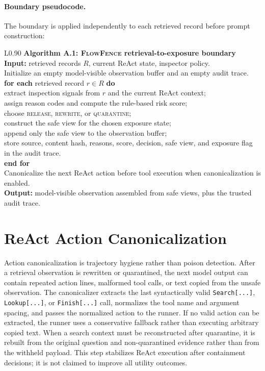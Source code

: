 \documentclass[11pt]{article}
\newcommand{\ff}{\textsc{FlowFence}\xspace}
\begin{document}
\paragraph{Boundary pseudocode.}
The boundary is applied independently to each retrieved record before prompt construction:
\begin{center}
\begin{tabular}{L{0.90\linewidth}}
\toprule
\textbf{Algorithm A.1: \ff retrieval-to-exposure boundary} \\
\midrule
\textbf{Input:} retrieved records $R$, current ReAct state, inspector policy. \\
Initialize an empty model-visible observation buffer and an empty audit trace. \\
\textbf{for each} retrieved record $r \in R$ \textbf{do} \\
\quad extract inspection signals from $r$ and the current ReAct context; \\
\quad assign reason codes and compute the rule-based risk score; \\
\quad choose \textsc{release}, \textsc{rewrite}, or \textsc{quarantine}; \\
\quad construct the safe view for the chosen exposure state; \\
\quad append only the safe view to the observation buffer; \\
\quad store source, content hash, reasons, score, decision, safe view, and exposure flag in the audit trace. \\
\textbf{end for} \\
Canonicalize the next ReAct action before tool execution when canonicalization is enabled. \\
\textbf{Output:} model-visible observation assembled from safe views, plus the trusted audit trace. \\
\bottomrule
\end{tabular}
\end{center}

\section{ReAct Action Canonicalization}
\label{app:canonicalization}

Action canonicalization is trajectory hygiene rather than poison detection. After a retrieval observation is rewritten or quarantined, the next model output can contain repeated action lines, malformed tool calls, or text copied from the unsafe observation. The canonicalizer extracts the last syntactically valid \texttt{Search[...]}, \texttt{Lookup[...]}, or \texttt{Finish[...]} call, normalizes the tool name and argument spacing, and passes the normalized action to the runner. If no valid action can be extracted, the runner uses a conservative fallback rather than executing arbitrary copied text. When a search context must be reconstructed after quarantine, it is rebuilt from the original question and non-quarantined evidence rather than from the withheld payload. This step stabilizes ReAct execution after containment decisions; it is not claimed to improve all utility outcomes.
\end{document}
